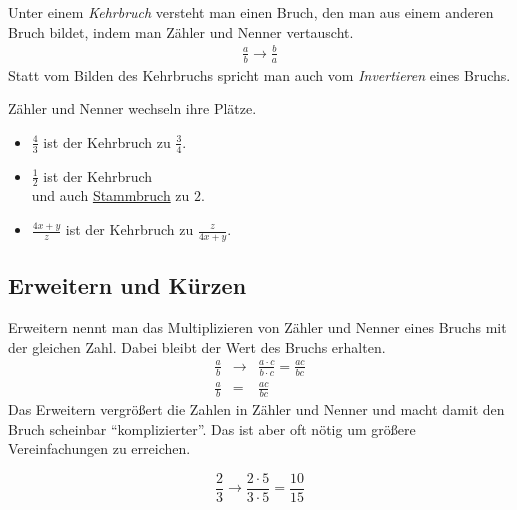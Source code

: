 \begin{defi}[Kehrbruch]
 Unter einem \emph{Kehrbruch} versteht man einen Bruch, den man aus einem anderen Bruch bildet, indem man Zähler und Nenner vertauscht.
 \begin{align*}
\frac{a}{b} \rightarrow \frac{b}{a}
 \end{align*}
 Statt vom Bilden des Kehrbruchs spricht man auch vom \emph{Invertieren} eines Bruchs.
\end{defi}

\begin{bsp}[Kehrbruch]
Zähler und Nenner wechseln ihre Plätze.

 \begin{itemize}
  \item \(\frac{4}{3}\) ist der Kehrbruch zu \(\frac{3}{4}\).
  \item \(\frac{1}{2}\) ist der Kehrbruch\\ und auch \hyperref[def:stammbruch]{Stammbruch} zu \(2\).
  \item \(\frac{4x+y}{z}\) ist der Kehrbruch zu \(\frac{z}{4x+y}\).
 \end{itemize}

\end{bsp}


\subsection{Erweitern und Kürzen}

\begin{regel}[Erweitern]
 Erweitern nennt man das Multiplizieren von Zähler und Nenner eines Bruchs mit der gleichen Zahl. Dabei bleibt der Wert des Bruchs erhalten.
 \begin{eqnarray*}
  \frac{a}{b} &\rightarrow& \frac{a\cdot c}{b\cdot c} = \frac{ac}{bc}\\
  \frac{a}{b} &=& \frac{ac}{bc}
 \end{eqnarray*}
 Das Erweitern vergrößert die Zahlen in Zähler und Nenner und macht damit den Bruch scheinbar "`komplizierter"'. Das ist aber oft nötig um größere Vereinfachungen zu erreichen.
\end{regel}

\begin{bsp}
 \begin{equation*}
  \frac{2}{3} \rightarrow \frac{2\cdot 5}{3\cdot 5}=\frac{10}{15}
  \end{equation*}
\end{bsp}

